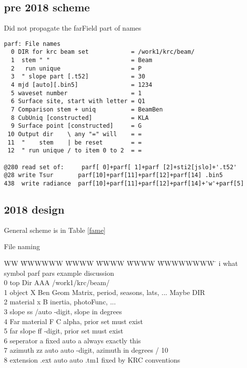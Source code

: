 \documentclass{article}
\begin{document}
\subsection{pre 2018 scheme}
Did not propagate the farField part of names
\vspace{-3.mm} 
\begin{verbatim}
parf: File names
  0 DIR for krc beam set            = /work1/krc/beam/
  1  stem " "                       = Beam
  2   run unique                    = P
  3  " slope part [.t52]            = 30
  4 mjd [auto][.bin5]               = 1234
  5 waveset number                  = 1
  6 Surface site, start with letter = Q1
  7 Comparison stem + uniq          = BeamBen
  8 CubUniq [constructed]           = KLA
  9 Surface point [constructed]     = G
 10 Output dir    \ any "=" will    = =
 11  "    stem    | be reset        = =
 12  " run unique / to item 0 to 2  = =

@280 read set of:     parf[ 0]+parf[ 1]+parf [2]+sti2[jslo]+'.t52'
@28 write Tsur       parf[10]+parf[11]+parf[12]+parf[14] .bin5
438  write radiance  parf[10]+parf[11]+parf[12]+parf[14]+'w'+parf[5]
\end{verbatim}  

\subsection{2018 design}
General scheme is in Table \ref{fame}
\begin{table} \caption[File naming]{File naming}  \label{fame}
\begin{tabbing} 
WW \= WWWWWW \= WWWW \= WWWW \=WWWW \= WWWWWWWW \=   \kill 
i \> what \> symbol \> parf \> pars \>example \> discussion \\
0  \> top Dir \> AAA   \> /work1/krc/beam/  \>   \\
1 \> object  \> X  \>   \> Ben \> Geom Matrix, period, seasons, lats, ... Maybe  DIR   \\
2 \> material\> x \>   \>  B \> inertia, photoFunc, ...  \\
3 \> slope   \> ss /auto \>   -digit, slope in degrees  \\
4 \> Far material \> F  \>  \> C  \> alpha, prior set must exist  \\
5 \> far slope  \> ff  \>    -digit, prior set must exist  \\
6 \> seperator  \> a \> fixed \> auto  \> a \> always exactly this  \\
7 \> azimuth    \> zz \> auto \> auto    -digit, azimuth in degrees / 10  \\
8 \> extension  \> .ext \> auto  \> auto \> .tm1 \> fixed by KRC conventions  \\
\end{tabbing}
\hrulefill \end{table}  
\end{document}
